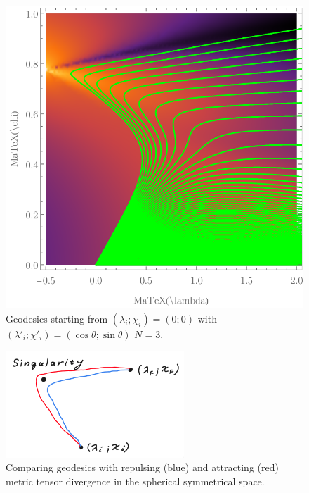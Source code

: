 \begin{figure}[h]
    \centering
    \includegraphics{../img/N=3_geodesics.pdf}
    \caption{Geodesics starting from $(\lambda_i;\chi_i)=(0;0)$ with $(\lambda'_i;\chi'_i)=(\cos\theta;\sin\theta)$ $N=3$.}
    \label{fig:N=3_geodesics}    
\end{figure}
\begin{figure}[h]
    \centering
    \includegraphics[width=0.6\textwidth]{../img/geodesicsinGR.png}
    \caption{Comparing geodesics with repulsing (blue) and attracting (red) metric tensor divergence in the spherical symmetrical space. }
    \label{fig:geodesicsinGR}
\end{figure}


\newpage
